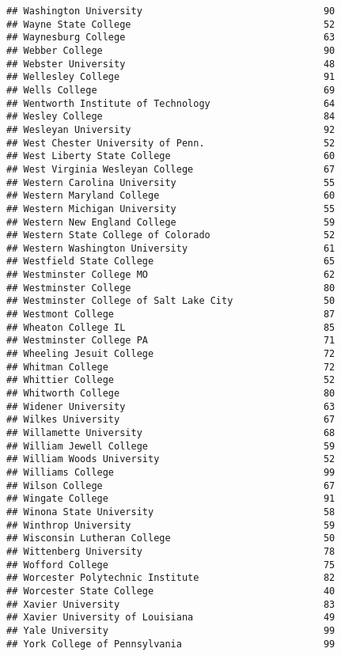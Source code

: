 \documentclass[
]{article}
\begin{document}
\begin{verbatim}
## Washington University                                90
## Wayne State College                                  52
## Waynesburg College                                   63
## Webber College                                       90
## Webster University                                   48
## Wellesley College                                    91
## Wells College                                        69
## Wentworth Institute of Technology                    64
## Wesley College                                       84
## Wesleyan University                                  92
## West Chester University of Penn.                     52
## West Liberty State College                           60
## West Virginia Wesleyan College                       67
## Western Carolina University                          55
## Western Maryland College                             60
## Western Michigan University                          55
## Western New England College                          59
## Western State College of Colorado                    52
## Western Washington University                        61
## Westfield State College                              65
## Westminster College MO                               62
## Westminster College                                  80
## Westminster College of Salt Lake City                50
## Westmont College                                     87
## Wheaton College IL                                   85
## Westminster College PA                               71
## Wheeling Jesuit College                              72
## Whitman College                                      72
## Whittier College                                     52
## Whitworth College                                    80
## Widener University                                   63
## Wilkes University                                    67
## Willamette University                                68
## William Jewell College                               59
## William Woods University                             52
## Williams College                                     99
## Wilson College                                       67
## Wingate College                                      91
## Winona State University                              58
## Winthrop University                                  59
## Wisconsin Lutheran College                           50
## Wittenberg University                                78
## Wofford College                                      75
## Worcester Polytechnic Institute                      82
## Worcester State College                              40
## Xavier University                                    83
## Xavier University of Louisiana                       49
## Yale University                                      99
## York College of Pennsylvania                         99
\end{verbatim}
\end{document}
